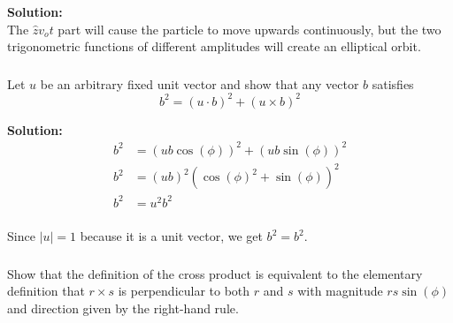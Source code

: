 \documentclass{article}
\newcommand\Problem{%
    \subsubsection{}%
}
\newcommand\TheSolution{%
  \textbf{Solution:}\\%
}
\begin{document}
\TheSolution
The $\hat{z}v_o t$ part will cause the particle to move upwards continuously, but the two trigonometric functions of different amplitudes will create an elliptical orbit.

\Problem
Let $u$ be an arbitrary fixed unit vector and show that any vector $b$ satisfies
\[b^2 = (u \cdot b)^2 + (u \times b)^2\]

\TheSolution
\begin{equation}
    \begin{aligned}
        b^2 & = (ub\cos(\phi))^2 + (ub\sin(\phi))^2 \\
        b^2 & = (ub)^2(\cos(\phi)^2 + \sin(\phi))^2 \\
        b^2 & = u^2 b^2                             \\
    \end{aligned}
\end{equation}

Since $|u| = 1$ because it is a unit vector, we get $b^2 = b^2$.

\Problem
Show that the definition of the cross product is equivalent to the elementary definition that $r \times s$ is perpendicular to both $r$ and $s$ with magnitude $rs\sin(\phi)$ and direction given by the right-hand rule.
\end{document}
